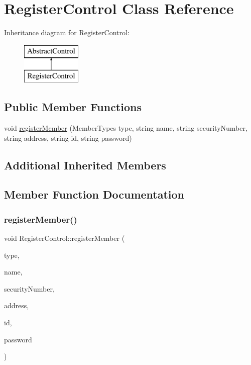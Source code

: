 \hypertarget{class_register_control}{}\section{Register\+Control Class Reference}
\label{class_register_control}
Inheritance diagram for Register\+Control\+:\begin{figure}[H]
\begin{center}
\leavevmode
\includegraphics[height=2.000000cm]{class_register_control}
\end{center}
\end{figure}
\subsection*{Public Member Functions}
\begin{DoxyCompactItemize}
\item 
void \mbox{\hyperlink{class_register_control_ad973b13d8abde9fa2a9a0cd623a614b3}{register\+Member}} (Member\+Types type, string name, string security\+Number, string address, string id, string password)
\end{DoxyCompactItemize}
\subsection*{Additional Inherited Members}


\subsection{Member Function Documentation}
\mbox{\label{class_register_control_ad973b13d8abde9fa2a9a0cd623a614b3}} 
\subsubsection{\texorpdfstring{register\+Member()}{registerMember()}}
{\footnotesize\ttfamily void Register\+Control\+::register\+Member (\begin{DoxyParamCaption}\item[{Member\+Types}]{type,  }\item[{string}]{name,  }\item[{string}]{security\+Number,  }\item[{string}]{address,  }\item[{string}]{id,  }\item[{string}]{password }\end{DoxyParamCaption})}

